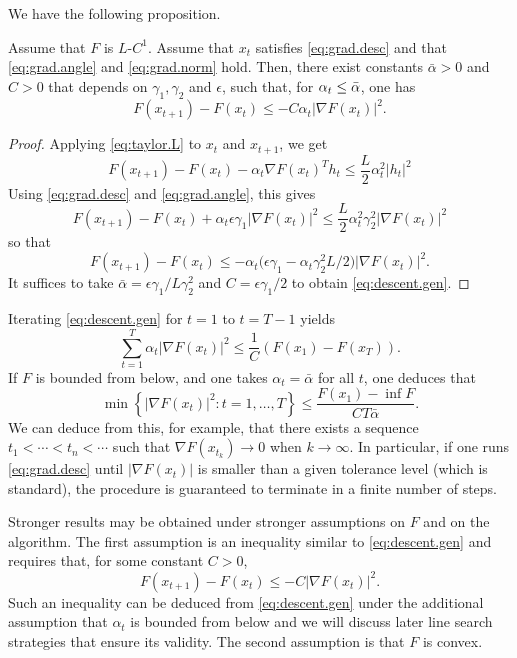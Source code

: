 We have the following proposition.
\begin{proposition}
\label{prop:descent.gen}
Assume that $F$ is $L$-$C^1$.
Assume that $x_t$ satisfies \cref{eq:grad.desc} and that \cref{eq:grad.angle} and \cref{eq:grad.norm} hold. Then, there exist constants $\bar \alpha>0$ and $C>0$ that depends on $\gamma_1, \gamma_2$ and $\epsilon$, such that, for $\alpha_t \leq \bar\alpha$, one has
\begin{equation}
\label{eq:descent.gen}
F(x_{t+1}) - F(x_t) \leq - C \alpha_t |\nabla F(x_t)|^2.
\end{equation}
\end{proposition}
\begin{proof}
Applying \cref{eq:taylor.L} to $x_t$ and $x_{t+1}$, we get
\[
F(x_{t+1}) - F(x_t) - \alpha_t \nabla F(x_t)^T h_t \leq \frac{L}{2} \alpha_t^2 |h_t|^2
\]
Using \cref{eq:grad.desc} and  \cref{eq:grad.angle}, this gives
\[
F(x_{t+1}) - F(x_t) + \alpha_t\epsilon\gamma_1 |\nabla F(x_t)|^2 \leq \frac{L}{2} \alpha_t^2\gamma_2^2 |\nabla F(x_t)|^2
\]
so that
\[
F(x_{t+1}) - F(x_t) \leq - \alpha_t \big(\epsilon\gamma_1 -\alpha_t \gamma_2^2 L/2\big) |\nabla F(x_t)|^2. 
\]
It suffices to take $\bar \alpha = \epsilon\gamma_1/L\gamma_2^2$ and $C = \epsilon\gamma_1/2$ to obtain \cref{eq:descent.gen}.
\end{proof}
Iterating \cref{eq:descent.gen} for $t=1$ to $t=T-1$ yields 
\[
\sum_{t=1}^T \alpha_t |\nabla F(x_t)|^2 \leq \frac1C (F(x_1) - F(x_T)).
\]
If $F$ is bounded from below, and one takes $\alpha_t = \bar\alpha$ for all $t$, one deduces that
\[
\min \left\{|\nabla F(x_t)|^2: t=1, \ldots, T\right\} \leq \frac{F(x_1) - \inf F}{CT \bar\alpha} .
\]
We can deduce from this, for example, that there exists a sequence $t_1 < \cdots < t_n<\cdots$ such that  $\nabla F(x_{t_k}) \to 0$ when $k\to\infty$. In particular, if one runs \cref{eq:grad.desc} until $|\nabla F(x_t)|$ is smaller than a given tolerance level (which is standard), the procedure is guaranteed to terminate in a finite number of steps.


Stronger results may be obtained under stronger assumptions on $F$ and on the algorithm. The first assumption is an inequality similar to \cref{eq:descent.gen} and requires that, for some constant $C>0$,
\begin{equation}
\label{eq:descent.good}
F(x_{t+1}) - F(x_t) \leq - C  |\nabla F(x_t)|^2.
\end{equation}
Such an inequality can be deduced from \cref{eq:descent.gen} under the additional assumption that $\alpha_t$ is bounded from below and we will discuss later line search strategies that ensure its validity. The second assumption is that $F$ is convex.   

